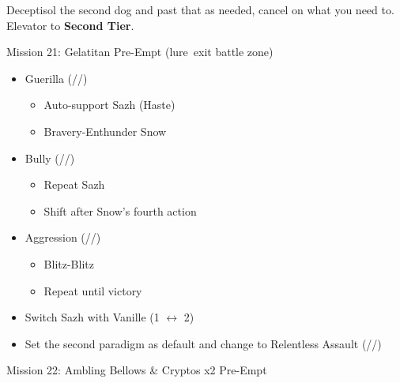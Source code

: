 \renewcommand{\first}{[1] Guerilla (\syn/\sab/\rav)}
\renewcommand{\second}{[2] Devastation (\com/\sab/\com)}
\renewcommand{\third}{[3] Hero's Charge (\syn/\med/\com)}
\renewcommand{\fourth}{[4] Tireless Charge (\com/\med/\com)}
\renewcommand{\fifth}{[5] Bully (\syn/\sab/\com)}
\renewcommand{\sixth}{[6] Aggression (\com/\rav/\com)}
\begin{multicols}{2}

	Deceptisol the second dog and past that as needed, cancel on what you need to.
	Elevator to \textbf{Second Tier}.
	\begin{battle}[0:37]{Mission 21: Gelatitan Pre-Empt (lure\, exit battle zone)}
		\begin{itemize}
			\item \first
			      \begin{itemize}
				      \item Auto-support Sazh (Haste)
				      \item Bravery-Enthunder Snow
			      \end{itemize}
			\item \fifth
			      \begin{itemize}
				      \item Repeat Sazh
				      \item Shift after Snow's fourth action
			      \end{itemize}
			\item \sixth
			      \begin{itemize}
				      \item Blitz-Blitz
				      \item Repeat until victory
			      \end{itemize}
		\end{itemize}
		\itemdrop{0.3}{Aegisol}
	\end{battle}
	\begin{menu}
		\begin{itemize}
			\paradigm
			\begin{itemize}
				\item Switch Sazh with Vanille (1 $\leftrightarrow$ 2)
				\item Set the second paradigm as default and change to Relentless Assault (\rav/\com/\rav)
			\end{itemize}
		\end{itemize}
	\end{menu}
	\renewcommand{\second}{[2]Relentless Assault (\rav/\com/\rav)}
	\vfill
	\begin{battle}[0:26]{Mission 22: Ambling Bellows \& Cryptos x2 Pre-Empt}

\end{battle}
\end{multicols}
